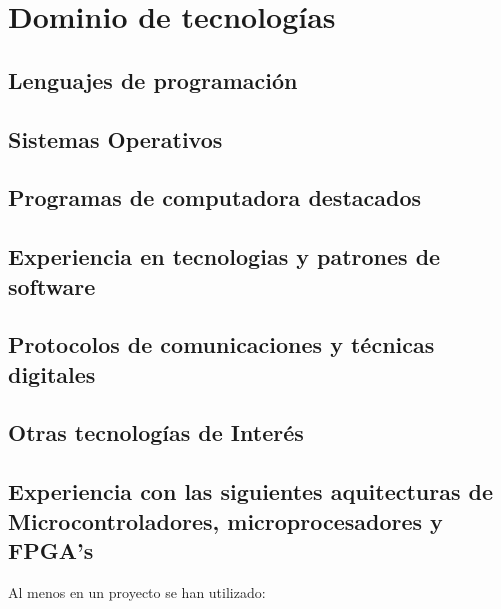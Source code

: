
\section{Dominio de tecnologías}
   \subsection{Lenguajes de programación}
      \cvitem { \dicadvanced }{\proglangadvanced }
      \cvitem { \dicmedium   }{\proglangmedium   }
      \cvitem { \dicbasic    }{\proglangbasic    }

   \subsection{Sistemas Operativos}
      \cvitem { \dicadvanced } { \osadvanced }
      \cvitem { \dicmedium   } { \osmedium   }
      \cvitem { \dicbasic    } { \osbasic    }

   \subsection{Programas de computadora destacados}
      \cvitem { \dicadvanced } { \computerprogadvanced }
      \cvitem { \dicmedium   } { \computerprogmedium   }
      \cvitem { \dicbasic    } { \computerprogbasic    }

   \subsection{Experiencia en tecnologias y patrones de software}
      \cvitem { \dicadvanced } { \softtechadvanced }
      \cvitem { \dicmedium   } { \softtechmedium   }
      \cvitem { \dicbasic    } { \softtechbasic    }

   \subsection{Protocolos de comunicaciones y técnicas digitales}
      \cvitem{\dicadvanced }{ \protocoladvanced }
      \cvitem{\dicmedium   }{ \protocolmedium   }
      \cvitem{\dicbasic    }{ \protocolbasic    }

   \subsection{Otras tecnologías de Interés}
      \cvitem{\dicadvanced} { \othertechadvanced }
      \cvitem{\dicmedium  } { \othertechmedium   }
      \cvitem{\dicbasic   } { \othertechbasic    }

   \subsection{Experiencia con las siguientes aquitecturas de Microcontroladores, microprocesadores y FPGA's}
      \cvitem {} {Al menos en un proyecto se han utilizado:}

